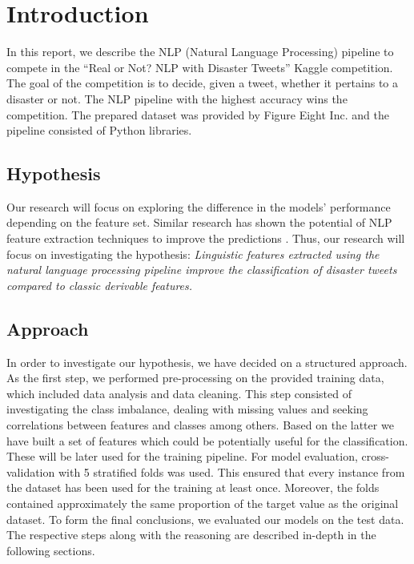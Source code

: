 \section{Introduction}
In this report, we describe the NLP (Natural Language Processing) pipeline to compete in the ``Real or Not? NLP with Disaster Tweets'' Kaggle competition.
The goal of the competition is to decide, given a tweet, whether it pertains to a disaster or not.
The NLP pipeline with the highest accuracy wins the competition.
The prepared dataset was provided by Figure Eight Inc.
and the pipeline consisted of Python libraries.

\subsection{Hypothesis}
Our research will focus on exploring the difference in the models’ performance depending on the feature set. Similar research has shown the potential
of NLP feature extraction techniques to improve the predictions \cite{y1,y2,y3}.
Thus, our research will focus on investigating the hypothesis: \textit{Linguistic features extracted using the natural language processing pipeline
improve the classification of disaster tweets compared to classic derivable features.}

\subsection{Approach}
In order to investigate our hypothesis, we have decided on a structured approach.
As the first step, we performed pre-processing on the provided training data, which included data analysis and data cleaning.
This step consisted of investigating the class imbalance, dealing with missing values and seeking correlations between features and classes among others.
Based on the latter we have built a set of features which could be potentially useful for the classification.
These will be later used for the training pipeline.
For model evaluation, cross-validation with 5 stratified folds was used.
This ensured that every instance from the dataset has been used for the training at least once.
Moreover, the folds contained approximately the same proportion of the target value as the original dataset.
To form the final conclusions, we evaluated our models on the test data.
The respective steps along with the reasoning are described in-depth in the following sections.

